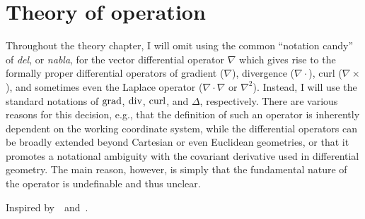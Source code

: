\documentclass[11pt,a4paper,twoside,openany]{report}
\begin{document}
    \chapter{Theory of operation}
    \label{chap:theory}

    \lipsum[5]

    Throughout the theory chapter, I will omit using the common \enquote{notation candy} of \emph{del}, or \emph{nabla}, for the vector differential operator $\nabla$ which gives rise to the formally proper differential operators of gradient ($\nabla$), divergence ($\nabla\cdot$), curl ($\nabla\times$), and sometimes even the Laplace operator ($\nabla\cdot\nabla$ or $\nabla^2$). Instead, I will use the standard notations of $\operatorname{grad}$, $\operatorname{div}$, $\operatorname{curl}$, and $\Delta$, respectively. There are various reasons for this decision, e.g., that the definition of such an operator is inherently dependent on the working coordinate system, while the differential operators can be broadly extended beyond Cartesian or even Euclidean geometries, or that it promotes a notational ambiguity with the covariant derivative used in differential geometry. The main reason, however, is simply that the fundamental nature of the operator is undefinable and thus unclear.

    Inspired by~\cite{balanis:advanced-engineering-electromagnetics}~and~\cite{griffiths:introduction-to-electrodynamics}.
\end{document}
